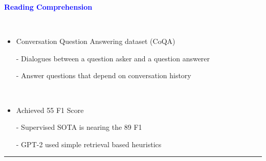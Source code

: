 \documentclass[professionalfont]{beamer}
\begin{document}
\begin{frame}
\begin{refsection}

\begin{center}
    { \textbf{\textcolor{blue}{ {\fontsize{12}{14}\selectfont Reading Comprehension} }} }
\end{center}
\\[0.3cm]

{\fontsize{10}{14}\selectfont 
\begin{itemize}
    \item Conversation Question Answering dataset (CoQA) \cite{coqa}
    
    - Dialogues between a question asker and a question answerer
    
    - Answer questions that depend on conversation history

    \\[0.3cm]

    \item Achieved 55 F1 Score

    - Supervised SOTA is nearing the 89 F1

    - GPT-2 used simple retrieval based heuristics

\end{itemize}
}

\vspace{0.3cm}
\hrule
\printbibliography 

\end{refsection}
\end{frame}
\end{document}
